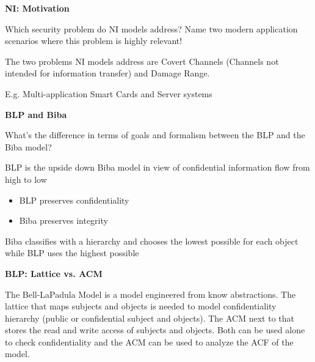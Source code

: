 \documentclass[10pt]{exam}  %
\begin{document}
\begin{questions}
    \question \textbf{NI: Motivation}\hfill

    Which security problem do NI models address? Name two modern application scenarios where this problem is highly relevant!
    \begin{solution}
        The two problems NI models address are Covert Channels (Channels not intended for information transfer) and Damage Range.

        E.g. Multi-application Smart Cards and Server systems
    \end{solution}

    \question \textbf{BLP and Biba}\hfill

    What's the difference in terms of goals and formalism between the BLP and the Biba model?
    \begin{solution}
        BLP is the upside down Biba model in view of confidential information flow from high to low 
        \begin{itemize}
            \item BLP preserves confidentiality 
            \item Biba preserves integrity
        \end{itemize}
    Biba classifies with a hierarchy and chooses the lowest possible for each object while BLP uses the highest possible
    \end{solution}

    \question \textbf{BLP: Lattice vs. ACM}\hfill
    \begin{solution}
        The Bell-LaPadula Model is a model engineered from know abstractions. The lattice that maps subjects and objects is needed to model confidentiality hierarchy (public or confidential subject and objects). The ACM next to that stores the read and write access of subjects and objects.
        Both can be used alone to check confidentiality and the ACM can be used to analyze the ACF of the model.
    \end{solution}


\end{questions}
\end{document}
